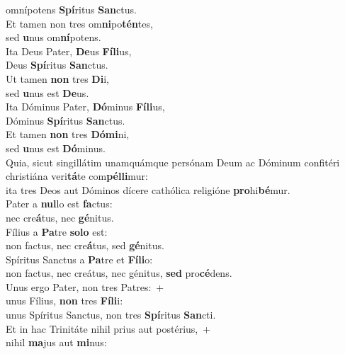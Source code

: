 \oddverse omnípotens \textbf{Spí}ritus \textbf{San}ctus.\\
\evenverse Et tamen non tres om\textbf{ni}po\textbf{tén}tes,~\*\\
\evenverse sed \textbf{u}nus om\textbf{ní}potens.\\
\oddverse Ita Deus Pater, \textbf{De}us \textbf{Fí}\textbf{li}us,~\*\\
\oddverse Deus \textbf{Spí}ritus \textbf{San}ctus.\\
\evenverse Ut tamen \textbf{non} tres \textbf{Di}i,~\*\\
\evenverse sed \textbf{u}nus est \textbf{De}us.\\
\oddverse Ita Dóminus Pater, \textbf{Dó}minus \textbf{Fí}\textbf{li}us,~\*\\
\oddverse Dóminus \textbf{Spí}ritus \textbf{San}ctus.\\
\evenverse Et tamen \textbf{non} tres \textbf{Dó}\textbf{mi}ni,~\*\\
\evenverse sed \textbf{u}nus est \textbf{Dó}minus.\\
\oddverse Quia, sicut singillátim unamquámque persónam Deum ac Dóminum confitéri christiána veri\textbf{tá}te com\textbf{pél}\textbf{li}mur:~\*\\
\oddverse ita tres Deos aut Dóminos dícere cathólica religióne \textbf{pro}hi\textbf{bé}mur.\\
\evenverse Pater a \textbf{nul}lo est \textbf{fa}ctus:~\*\\
\evenverse nec cre\textbf{á}tus, nec \textbf{gé}nitus.\\
\oddverse Fílius a \textbf{Pa}tre \textbf{so}\textbf{lo} est:~\*\\
\oddverse non factus, nec cre\textbf{á}tus, sed \textbf{gé}nitus.\\
\evenverse Spíritus Sanctus a \textbf{Pa}tre et \textbf{Fí}\textbf{li}o:~\*\\
\evenverse non factus, nec creátus, nec génitus, \textbf{sed} pro\textbf{cé}dens.\\
\oddverse Unus ergo Pater, non tres Patres:~+\\
\oddverse  unus Fílius, \textbf{non} tres \textbf{Fí}\textbf{li}i:~\*\\
\oddverse unus Spíritus Sanctus, non tres \textbf{Spí}ritus \textbf{San}cti.\\
\evenverse Et in hac Trinitáte nihil prius aut postérius,~+\\
\evenverse  nihil \textbf{ma}jus aut \textbf{mi}nus:~\*\\
